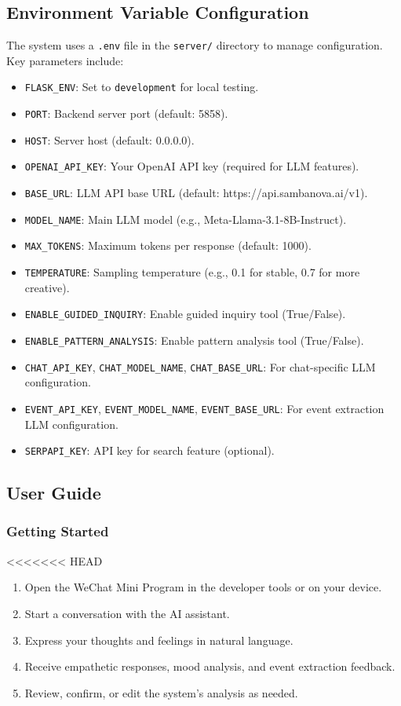 \subsection{Environment Variable Configuration}

The system uses a \texttt{.env} file in the \texttt{server/} directory to manage configuration. Key parameters include:

\begin{itemize}
    \item \texttt{FLASK_ENV}: Set to \texttt{development} for local testing.
    \item \texttt{PORT}: Backend server port (default: 5858).
    \item \texttt{HOST}: Server host (default: 0.0.0.0).
    \item \texttt{OPENAI_API_KEY}: Your OpenAI API key (required for LLM features).
    \item \texttt{BASE_URL}: LLM API base URL (default: https://api.sambanova.ai/v1).
    \item \texttt{MODEL_NAME}: Main LLM model (e.g., Meta-Llama-3.1-8B-Instruct).
    \item \texttt{MAX_TOKENS}: Maximum tokens per response (default: 1000).
    \item \texttt{TEMPERATURE}: Sampling temperature (e.g., 0.1 for stable, 0.7 for more creative).
    \item \texttt{ENABLE_GUIDED_INQUIRY}: Enable guided inquiry tool (True/False).
    \item \texttt{ENABLE_PATTERN_ANALYSIS}: Enable pattern analysis tool (True/False).
    \item \texttt{CHAT_API_KEY}, \texttt{CHAT_MODEL_NAME}, \texttt{CHAT_BASE_URL}: For chat-specific LLM configuration.
    \item \texttt{EVENT_API_KEY}, \texttt{EVENT_MODEL_NAME}, \texttt{EVENT_BASE_URL}: For event extraction LLM configuration.
    \item \texttt{SERPAPI_KEY}: API key for search feature (optional).
\end{itemize}

\subsection{User Guide}

\subsubsection{Getting Started}
<<<<<<< HEAD
\begin{enumerate}
    \item Open the WeChat Mini Program in the developer tools or on your device.
    \item Start a conversation with the AI assistant.
    \item Express your thoughts and feelings in natural language.
    \item Receive empathetic responses, mood analysis, and event extraction feedback.
    \item Review, confirm, or edit the system's analysis as needed.
\end{enumerate}

